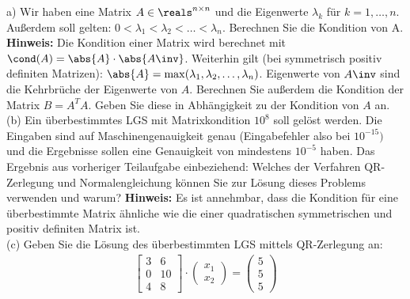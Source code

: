 \documentclass{scrartcl}
\begin{document}
	a)
	Wir haben eine  Matrix $A \in \reals^{n \times n}$ und die Eigenwerte $\lambda_k$ für $k=1, \dots, n$. 
	\n 
	Außerdem soll gelten: $0 < \lambda_1 < \lambda_2 < \dots < \lambda_n$.
	\n 
	Berechnen Sie die Kondition von A. \\
	\textbf{Hinweis:} Die Kondition einer Matrix wird berechnet mit $\cond(A) = \abs{A} \cdot \abs{A\inv}$. Weiterhin gilt (bei symmetrisch positiv definiten Matrizen): $\abs{A} = \max(\lambda_1, \lambda_2, \dots, \lambda_n)$. Eigenwerte von $A\inv$ sind die Kehrbrüche der Eigenwerte von $A$.
	\n
	Berechnen Sie außerdem die Kondition der Matrix $B= A^TA$. Geben Sie diese in Abhängigkeit zu der Kondition von $A$ an.
	\lbreak \lbreak \lbreak \lbreak
	\\
	(b)
	Ein überbestimmtes LGS mit Matrixkondition $10^8$ soll gelöst werden. Die Eingaben sind auf Maschinengenauigkeit genau (Eingabefehler also bei $10^{-15})$ und die Ergebnisse sollen eine Genauigkeit von mindestens $10^{-5}$ haben.
	\n 
	Das Ergebnis aus vorheriger Teilaufgabe einbeziehend: Welches der Verfahren QR-Zerlegung und Normalengleichung können Sie zur Lösung dieses Problems verwenden und warum?
	\n 
	\textbf{Hinweis:} Es ist annehmbar, dass die Kondition für eine überbestimmte Matrix ähnliche wie die einer quadratischen symmetrischen und positiv definiten Matrix ist.
	\lbreak \lbreak \lbreak
	\\
	(c) 
	Geben Sie die Lösung des überbestimmten LGS mittels QR-Zerlegung an:
	\begin{align*}
		\begin{bmatrix}
			3 & 6\\
			0 & 10\\
			4 & 8
		\end{bmatrix} \cdot
		\begin{pmatrix}
			x_1 \\
			x_2 
		\end{pmatrix} = 
		\begin{pmatrix}
			5 \\ 5 \\ 5
		\end{pmatrix}
	\end{align*}


\end{document}
